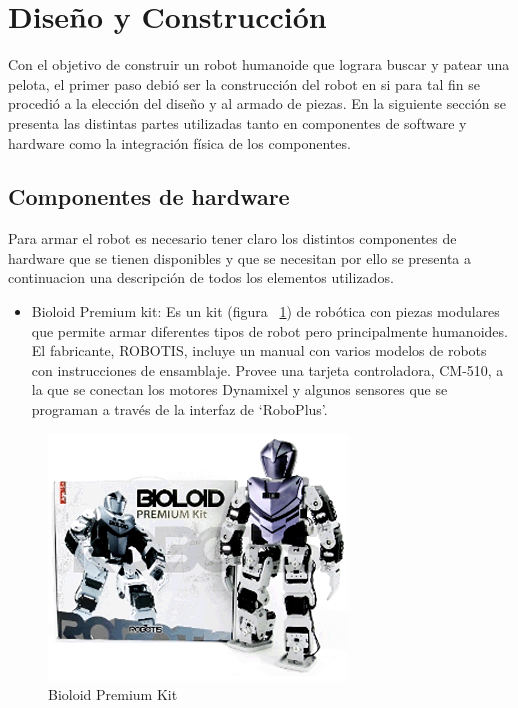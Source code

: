 
\label{chapter:diseno}
\section{Diseño y Construcción}

Con el objetivo de construir un robot humanoide que lograra buscar y patear una pelota, el primer paso debi\'o ser la construcci\'on del robot en si para tal fin se procedió a la elección del diseño y al armado de piezas. En la siguiente sección se presenta las distintas partes utilizadas tanto en componentes de software y hardware como la integración física de los componentes.

\subsection{Componentes de hardware}
Para armar el robot es necesario tener claro los distintos componentes de hardware que se tienen disponibles y que se necesitan por ello se presenta a continuacion una descripción de todos los elementos utilizados. 

\begin{itemize}
\item Bioloid Premium kit: Es un kit (figura ~\ref{fig:kit}) de robótica con piezas modulares que permite armar diferentes tipos de robot pero principalmente humanoides. El fabricante, ROBOTIS, incluye un manual con varios modelos de robots con instrucciones de ensamblaje. Provee una tarjeta controladora, CM-510, a la que se conectan los motores Dynamixel y algunos sensores que se programan a través de la interfaz de ‘RoboPlus’. \cite{robotics}

\end{itemize}

\begin{figure}[hbtp]

\centering
\includegraphics[scale=0.5]{imagenes/product_bioloid17.png}
\caption{Bioloid Premium Kit}
\label{fig:kit}
\end{figure}

